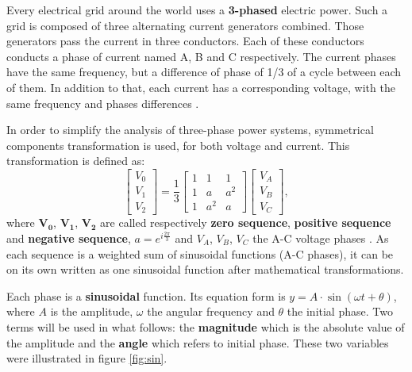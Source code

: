 Every electrical grid around the world uses a \textbf{3-phased} electric power. Such a grid is composed of three alternating current generators combined. Those generators pass the current in three conductors. Each of these conductors conducts a phase of current named A, B and C respectively. The current phases have the same frequency, but a difference of phase of 1/3 of a cycle between each of them. In addition to that, each current has a corresponding voltage, with the same frequency and phases differences \cite{noauthor_three-phase_2020}.

In order to simplify the analysis of three-phase power systems, symmetrical components transformation is used, for both voltage and current. This transformation is defined as:
\begin{equation}
     \begin{bmatrix}
        V_0 \\ V_1 \\ V_2 
    \end{bmatrix} = \frac 1 3 \begin{bmatrix}
        1 & 1& 1 \\
        1 & a & a^2 \\
        1 & a^2 & a
    \end{bmatrix}
    \begin{bmatrix}
        V_A \\ V_B \\ V_C
    \end{bmatrix},
\end{equation}
where $\mathbf{V_0}$, $\mathbf{V_1}$, $\mathbf{V_2}$ are called respectively \textbf{zero sequence}, \textbf{positive sequence} and \textbf{negative sequence}, $a = e^{i \frac{2\pi}{3}}$ and $V_A$, $V_B$, $V_C$ the A-C voltage phases \cite{jl_kirtley_jr_introduction_nodate}. As each sequence is a weighted sum of sinusoidal functions (A-C phases), it can be on its own written as one sinusoidal function after mathematical transformations.

Each phase is a \textbf{sinusoidal} function. Its equation form is $y = A \cdot \sin(\omega t + \theta)$, where $A$ is the amplitude, $\omega$ the angular frequency and $\theta$ the initial phase. Two terms will be used in what follows: the \textbf{magnitude} which is the absolute value of the amplitude and the \textbf{angle} which refers to initial phase. These two variables were illustrated in figure \ref{fig:sin}.

